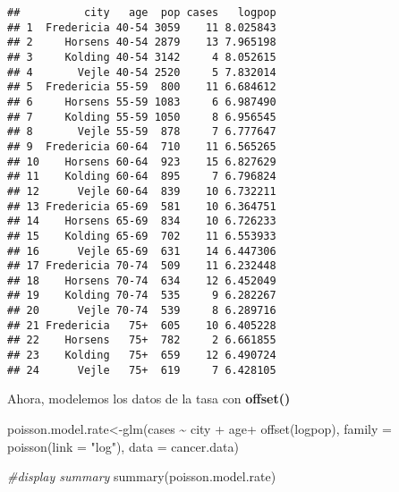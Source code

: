 \documentclass[
]{book}
\newenvironment{Shaded}{\begin{snugshade}}{\end{snugshade}}
\newcommand{\AttributeTok}[1]{\textcolor[rgb]{0.77,0.63,0.00}{#1}}
\newcommand{\CommentTok}[1]{\textcolor[rgb]{0.56,0.35,0.01}{\textit{#1}}}
\newcommand{\FunctionTok}[1]{\textcolor[rgb]{0.00,0.00,0.00}{#1}}
\newcommand{\NormalTok}[1]{#1}
\newcommand{\OtherTok}[1]{\textcolor[rgb]{0.56,0.35,0.01}{#1}}
\newcommand{\SpecialCharTok}[1]{\textcolor[rgb]{0.00,0.00,0.00}{#1}}
\newcommand{\StringTok}[1]{\textcolor[rgb]{0.31,0.60,0.02}{#1}}
\begin{document}
\begin{verbatim}
##          city   age  pop cases   logpop
## 1  Fredericia 40-54 3059    11 8.025843
## 2     Horsens 40-54 2879    13 7.965198
## 3     Kolding 40-54 3142     4 8.052615
## 4       Vejle 40-54 2520     5 7.832014
## 5  Fredericia 55-59  800    11 6.684612
## 6     Horsens 55-59 1083     6 6.987490
## 7     Kolding 55-59 1050     8 6.956545
## 8       Vejle 55-59  878     7 6.777647
## 9  Fredericia 60-64  710    11 6.565265
## 10    Horsens 60-64  923    15 6.827629
## 11    Kolding 60-64  895     7 6.796824
## 12      Vejle 60-64  839    10 6.732211
## 13 Fredericia 65-69  581    10 6.364751
## 14    Horsens 65-69  834    10 6.726233
## 15    Kolding 65-69  702    11 6.553933
## 16      Vejle 65-69  631    14 6.447306
## 17 Fredericia 70-74  509    11 6.232448
## 18    Horsens 70-74  634    12 6.452049
## 19    Kolding 70-74  535     9 6.282267
## 20      Vejle 70-74  539     8 6.289716
## 21 Fredericia   75+  605    10 6.405228
## 22    Horsens   75+  782     2 6.661855
## 23    Kolding   75+  659    12 6.490724
## 24      Vejle   75+  619     7 6.428105
\end{verbatim}

Ahora, modelemos los datos de la tasa con \textbf{offset()}

\begin{Shaded}
\begin{Highlighting}[]
\NormalTok{poisson.model.rate}\OtherTok{\textless{}{-}}\FunctionTok{glm}\NormalTok{(cases }\SpecialCharTok{\textasciitilde{}}\NormalTok{ city }\SpecialCharTok{+}\NormalTok{ age}\SpecialCharTok{+} \FunctionTok{offset}\NormalTok{(logpop), }\AttributeTok{family =} \FunctionTok{poisson}\NormalTok{(}\AttributeTok{link =} \StringTok{"log"}\NormalTok{), }\AttributeTok{data =}\NormalTok{ cancer.data)}

\CommentTok{\#display summary}
\FunctionTok{summary}\NormalTok{(poisson.model.rate)}
\end{Highlighting}
\end{Shaded}
\end{document}
